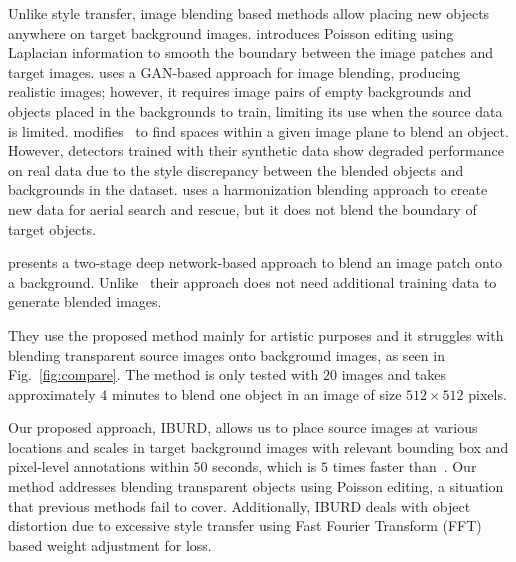 Unlike style transfer, image blending based methods allow placing new objects anywhere on target background images. 
\cite{perez_poisson_2003} introduces Poisson editing using Laplacian information to smooth the boundary between the image patches and target images. 
\cite{wu_gp-gan_2019} uses a GAN-based approach for image blending, producing realistic images; however, it requires image pairs of empty backgrounds and objects placed in the backgrounds to train, limiting its use when the source data is limited. 
\cite{georgakis_synthesizing_2017} modifies~\cite{perez_poisson_2003} to find spaces within a given image plane to blend an object. 
However, detectors trained with their synthetic data show degraded performance on real data due to the style discrepancy between the blended objects and backgrounds in the dataset.
\cite{zhang_training_2022} uses a harmonization blending approach to create new data for aerial search and rescue, but it does not blend the boundary of target objects. 

\cite{zhang_deep_2020} presents a two-stage deep network-based approach to blend an image patch onto a background. Unlike~\cite{wu_gp-gan_2019} their approach does not need additional training data to generate blended images.

They use the proposed method mainly for artistic purposes and it struggles with blending transparent source images onto background images, as seen in Fig.~\ref{fig:compare}. 
The method is only tested with $20$ images and takes approximately $4$ minutes to blend one object in an image of size $512\times512$ pixels.

Our proposed approach, IBURD, allows us to place source images at various locations and scales in target background images with relevant bounding box and pixel-level annotations within $50$ seconds, which is $5$ times faster than~\cite{zhang_deep_2020}. 
Our method addresses blending transparent objects using Poisson editing, a situation that previous methods fail to cover.
Additionally, IBURD deals with object distortion due to excessive style transfer using Fast Fourier Transform (FFT)~\cite{liu_image_2008} based weight adjustment for loss.
